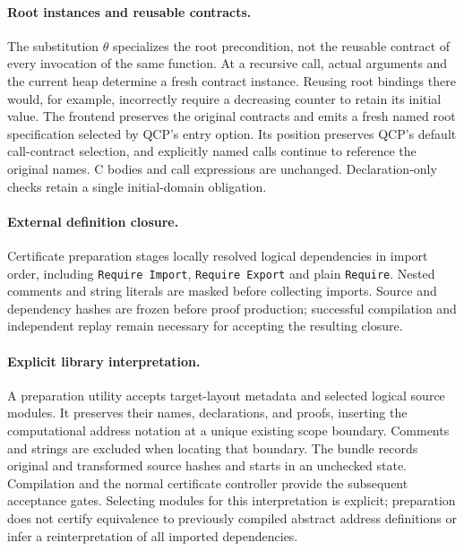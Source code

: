 \paragraph{Root instances and reusable contracts.}
The substitution $\theta$ specializes the root precondition, not the reusable
contract of every invocation of the same function. At a recursive call, actual
arguments and the current heap determine a fresh contract instance. Reusing
root bindings there would, for example, incorrectly require a decreasing
counter to retain its initial value. The frontend preserves the original
contracts and emits a fresh named root specification selected by QCP's entry
option. Its position preserves QCP's default call-contract selection, and
explicitly named calls continue to reference the original names. C bodies and
call expressions are unchanged. Declaration-only checks retain a single
initial-domain obligation.


\paragraph{External definition closure.}
Certificate preparation stages locally resolved logical dependencies in
import order, including \texttt{Require Import}, \texttt{Require Export} and
plain \texttt{Require}. Nested comments and string literals are masked before
collecting imports. Source and dependency hashes are frozen before proof
production; successful compilation and independent replay remain necessary
for accepting the resulting closure.


\paragraph{Explicit library interpretation.}
A preparation utility accepts target-layout metadata and selected logical
source modules. It preserves their names, declarations, and proofs, inserting
the computational address notation at a unique existing scope boundary.
Comments and strings are excluded when locating that boundary. The bundle
records original and transformed source hashes and starts in an unchecked
state. Compilation and the normal certificate controller provide the subsequent
acceptance gates. Selecting modules for this interpretation is explicit;
preparation does not certify equivalence to previously compiled abstract
address definitions or infer a reinterpretation of all imported dependencies.
